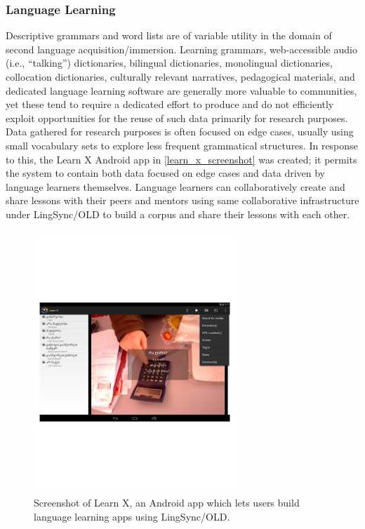 \documentclass[11pt]{article}
\begin{document}
\subsubsection{Language Learning}

Descriptive grammars and word lists are of variable utility in the domain of second language acquisition/immersion.
Learning grammars, web-accessible audio (i.e., ``talking'') dictionaries, bilingual dictionaries, monolingual dictionaries, collocation dictionaries, culturally relevant narratives, pedagogical materials, and dedicated language
learning software are generally more valuable to communities, yet these tend to
require a dedicated effort to produce and do not efficiently exploit
opportunities for the reuse of such data primarily for research purposes. 
Data gathered for research purposes is often focused on edge cases, usually
using small vocabulary sets to explore less frequent grammatical structures.
In response to this, the Learn X Android app in \autoref{learn_x_screenshot}
was created; it permits the system to contain both data focused on edge cases and data driven by language learners themselves. Language learners can collaboratively create and share
lessons with their peers and mentors using same collaborative infrastructure under LingSync/OLD to build a corpus and share
their lessons with each other. 

\begin{figure}
\begin{center}
\includegraphics[width=3in]{images/learnX}
\caption{Screenshot of Learn X, an Android app which lets users build language
learning apps using LingSync/OLD.}
\label{learn_x_screenshot}
\end{center}
\end{figure}
\end{document}
